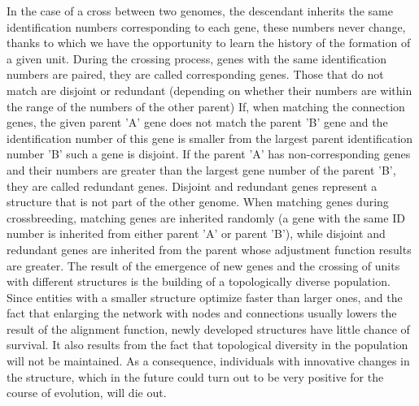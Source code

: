 In the case of a cross between two genomes, the descendant inherits the same identification numbers
corresponding to each gene, these numbers never change, thanks to which we have the opportunity 
to learn the history of the formation of a given unit. 
During the crossing process, genes with the same identification numbers are paired, 
they are called corresponding genes. 
Those that do not match are disjoint or redundant (depending on whether their numbers are 
within the range of the numbers of the other parent) 
If, when matching the connection genes, the given parent 'A' gene does not match the parent 'B' 
gene and the identification number of this gene is smaller from the largest parent identification 
number 'B' such a gene is disjoint. 
If the parent 'A' has non-corresponding genes and their numbers are greater than the largest gene 
number of the parent 'B', they are called redundant genes. 
Disjoint and redundant genes represent a structure that is not part of the other genome. 
When matching genes during crossbreeding, matching genes are inherited randomly 
(a gene with the same ID number is inherited from either parent 'A' or parent 'B'), 
while disjoint and redundant genes are inherited from the parent whose adjustment function results 
are greater. 
The result of the emergence of new genes and the crossing of units with different structures is 
the building of a topologically diverse population. Since entities with a smaller structure 
optimize faster than larger ones, and the fact that enlarging the network with nodes and 
connections usually lowers the result of the alignment function, newly developed structures have 
little chance of survival. 
It also results from the fact that topological diversity in the population will not be maintained. 
As a consequence, individuals with innovative changes in the structure, which in the future could 
turn out to be very positive for the course of evolution, will die out.

